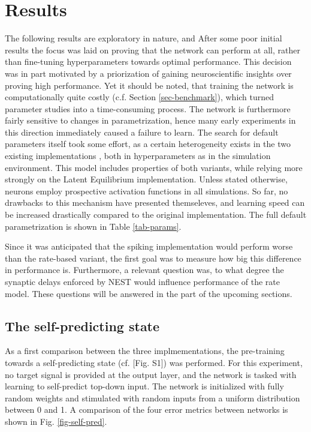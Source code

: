 
\chapter{Results}

The following results are exploratory in nature, and After some poor initial results the focus was laid on proving that
the network can perform at all, rather than fine-tuning hyperparameters towards optimal performance. This decision was
in part motivated by a priorization of gaining neuroscientific insights over proving high performance. Yet it should be
noted, that training the network is computationally quite costly (c.f. Section \ref{sec-benchmark}), which turned
parameter studies into a time-consuming process. The network is furthermore fairly sensitive to changes in
parametrization, hence many early experiments in this direction immediately caused a failure to learn. The search for
default parameters itself took some effort, as a certain heterogeneity exists in the two existing implementations
\citep{sacramento2018dendritic,Haider2021}, both in hyperparameters as in the simulation environment. This model
includes properties of both variants, while relying more strongly on the Latent Equilibrium implementation. Unless
stated otherwise, neurons employ prospective activation functions in all simulations. So far, no drawbacks to this
mechanism have presented themseleves, and learning speed can be increased drastically compared to the original
implementation. The full default parametrization is shown in Table \ref{tab-params}.

Since it was anticipated that the spiking implementation would perform worse than the rate-based variant, the first
goal was to measure how big this difference in performance is. Furthermore, a relevant question was, to what degree
the synaptic delays enforced by NEST would influence performance of the rate model. These questions will be answered
in the part of the upcoming sections.




\section{The self-predicting state}

As a first comparison between the three implmementations, the pre-training towards a self-predicting state (cf.
\cite{sacramento2018dendritic}[Fig. S1]) was performed. For this experiment, no target signal is provided at the output
layer, and the network is tasked with learning to self-predict top-down input. The network is initialized with fully
random weights and stimulated with random inputs from a uniform distribution between 0 and 1. A comparison of the
four error metrics between networks is shown in Fig. \ref{fig-self-pred}.



